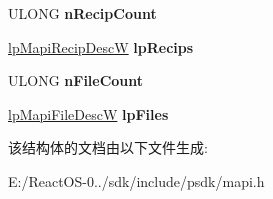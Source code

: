 \begin{DoxyCompactItemize}
U\+L\+O\+NG {\bfseries n\+Recip\+Count}
\item 
\mbox{\label{struct_mapi_message_w_a18e66629a2c8e37357129d37f1ae8088}} 
\hyperlink{struct_mapi_recip_desc_w}{lp\+Mapi\+Recip\+DescW} {\bfseries lp\+Recips}
\item 
\mbox{\label{struct_mapi_message_w_a737fb44be3c060eded797514abbe3966}} 
U\+L\+O\+NG {\bfseries n\+File\+Count}
\item 
\mbox{\label{struct_mapi_message_w_a9c3e030174a48047fb1e101065777a78}} 
\hyperlink{struct_mapi_file_desc_w}{lp\+Mapi\+File\+DescW} {\bfseries lp\+Files}
\end{DoxyCompactItemize}


该结构体的文档由以下文件生成\+:\begin{DoxyCompactItemize}
\item 
E\+:/\+React\+O\+S-\/0../sdk/include/psdk/mapi.\+h\end{DoxyCompactItemize}
